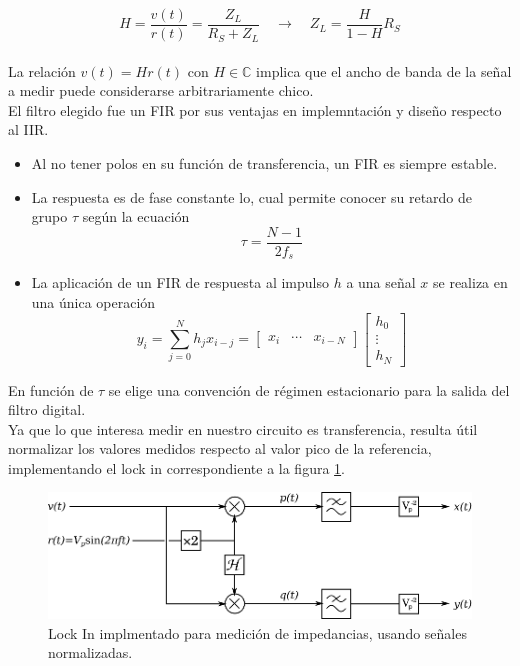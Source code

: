 \documentclass[11pt,a4paper]{extarticle}
\begin{document}
\begin{multicols}{2}
\begin{equation}\label{eq:impedancia}
	H = \frac{v(t)}{r(t)} = \frac{Z_L}{R_S + Z_L} \quad \longrightarrow \quad Z_L =  \frac{H}{1-H}R_S	
\end{equation}\\[-1em]

La relación $v(t) = H r(t)$ con $H \in \mathbb C$ implica que el ancho de banda de la señal a medir puede considerarse arbitrariamente chico.\\

El filtro elegido fue un FIR por sus ventajas en implemntación y diseño respecto al IIR.\cite{haykin_8}
\begin{itemize}
	\item Al no tener polos en su función de transferencia, un FIR es siempre estable.
	\item La respuesta es de fase constante lo, cual permite conocer su retardo de grupo $\tau$ según la ecuación
	\begin{equation}\label{eq:tau}
		\tau = \frac{N-1}{2f_s}
	\end{equation}
	\item La aplicación de un FIR de respuesta al impulso $h$ a una señal $x$ se realiza en una única operación
	\begin{equation*}\label{eq:fir}
		y_i = \sum_{j=0}^N h_jx_{i-j}= 
		\begin{bmatrix}
			x_i & \cdots & x_{i-N}
		\end{bmatrix}
		\begin{bmatrix}
			h_0 \\ \vdots \\ h_N	
		\end{bmatrix}
	\end{equation*}
\end{itemize} 


En función de $\tau$ se elige una convención de régimen estacionario para la salida del filtro digital.\\

Ya que lo que interesa medir en nuestro circuito es transferencia, resulta útil normalizar los valores medidos respecto al valor pico de la referencia, implementando el lock in correspondiente a la figura \ref{fig:nuestro_lockin}.

\begin{figure}[H]
	\centering
	\includegraphics[width=\linewidth]{Images/nuestro_lockin.eps}
	\caption{Lock In implmentado para medición de impedancias, usando señales normalizadas.}
	\label{fig:nuestro_lockin}
\end{figure}


\end{multicols}
\end{document}
